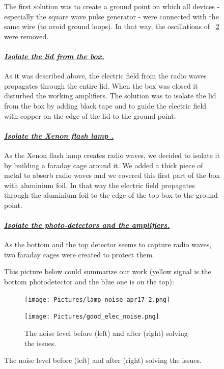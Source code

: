 \documentclass[a4paper, 11pt]{report}%
\newcommand{\xfl}{Xenon flash lamp }
\begin{document}
\begin{figure}[!hbtp]
  The first solution was to create a ground point on which all devices - especially the square wave pulse generator - were connected with the same wire 
  (to avoid ground loops). In that way, the oscillations of ~\ref{fig:comparaison} were removed. 
  
  \paragraph{\underline{\emph{Isolate the lid from the box.}}}
  
  As it was described above, the electric field from the radio waves propagates through the entire lid. When the box was closed it disturbed the working 
  amplifiers. The solution was to isolate the lid from the box by adding black tape and to guide the electric field with copper on the edge of the lid
  to the ground point.

  \paragraph{\underline{\emph{Isolate the \xfl.}}}
  
  As the \xfl creates radio waves, we decided to isolate it by building a faraday cage around it. We added a thick piece of metal to absorb radio waves 
  and we covered this first part of the box with aluminium foil. In that way the electric field propagates through the aluminium foil to the edge of the top
  box to the ground point. 

  \paragraph{\underline{\emph{Isolate the photo-detectors and the amplifiers.}}}
  
  As the bottom and the top detector seems to capture radio waves, two faraday cages were created to protect them.
  
  This picture below could summarize our work (yellow signal is the bottom photodetector and the blue one is on the top):
 
  \begin{figure}[!hbtp]
  \begin{minipage}[t,High electronic noise level.]{0.49\linewidth}
    \texttt{[image: Pictures/lamp\_noise\_apr17\_2.png]}
  \end{minipage}
  \quad
  \begin{minipage}[t,Low electronic noise level.]{0.49\linewidth}
    \texttt{[image: Pictures/good\_elec\_noise.png]}
  \end{minipage}
  \caption{The noise level before (left) and after (right) solving the issues.}
  \label{fig:comparaison}
  \end{figure}
  

\end{figure}
\end{document}
